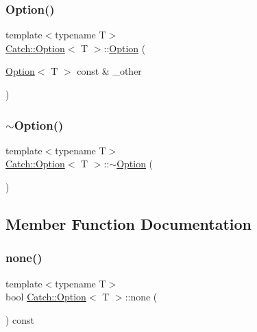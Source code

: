 \subsubsection{\texorpdfstring{Option()}{Option()}\hspace{0.1cm}{\footnotesize\ttfamily [3/3]}}
{\footnotesize\ttfamily template$<$typename T$>$ \\
\hyperlink{class_catch_1_1_option}{Catch\+::\+Option}$<$ T $>$\+::\hyperlink{class_catch_1_1_option}{Option} (\begin{DoxyParamCaption}\item[{\hyperlink{class_catch_1_1_option}{Option}$<$ T $>$ const \&}]{\+\_\+other }\end{DoxyParamCaption})\hspace{0.3cm}{\ttfamily [inline]}}

\mbox{\label{class_catch_1_1_option_a37fe90bb47bb909f150a5ad6be25581a}} 
\subsubsection{\texorpdfstring{$\sim$\+Option()}{~Option()}}
{\footnotesize\ttfamily template$<$typename T$>$ \\
\hyperlink{class_catch_1_1_option}{Catch\+::\+Option}$<$ T $>$\+::$\sim$\hyperlink{class_catch_1_1_option}{Option} (\begin{DoxyParamCaption}{ }\end{DoxyParamCaption})\hspace{0.3cm}{\ttfamily [inline]}}



\subsection{Member Function Documentation}
\mbox{\label{class_catch_1_1_option_a821753afdc3fac947a13a01fbe0d248e}} 
\subsubsection{\texorpdfstring{none()}{none()}}
{\footnotesize\ttfamily template$<$typename T$>$ \\
bool \hyperlink{class_catch_1_1_option}{Catch\+::\+Option}$<$ T $>$\+::none (\begin{DoxyParamCaption}{ }\end{DoxyParamCaption}) const\hspace{0.3cm}{\ttfamily [inline]}}

